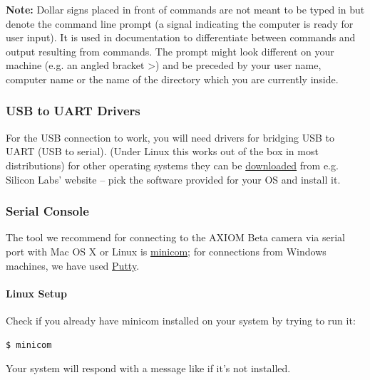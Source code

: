\textbf{Note:} Dollar signs placed in front of commands are not meant to be typed in but denote the command line prompt (a signal indicating the computer is ready for user input). It is used in documentation to differentiate between commands and output resulting from commands. The prompt might look different on your machine (e.g. an angled bracket >) and be preceded by your user name, computer name or the name of the directory which you are currently inside.



\subsubsection{USB to UART Drivers}

For the USB connection to work, you will need drivers for bridging USB to UART (USB to serial). (Under Linux this works out of the box in most 	distributions) for other operating systems they can be \href{https://www.silabs.com/products/development-tools/software/usb-to-uart-bridge-vcp-drivers}{downloaded} from e.g. Silicon Labs' website – pick the software provided for your OS and install it. \\

\subsubsection{Serial Console}

The tool we recommend for connecting to the AXIOM Beta camera via serial port with Mac OS X or Linux is \href{https://linux.die.net/man/1/minicom}{minicom}; for connections from Windows machines, we have used \href{http://www.putty.org/}{Putty}.

\paragraph{Linux Setup}

Check if you already have minicom installed on your system by trying to run it:

\begin{lstlisting}[language=bash,morekeywords=$,keywordstyle=\bfseries,frame=none,xleftmargin=.25in,belowskip=2em, aboveskip=2em]
$ minicom
\end{lstlisting}

Your system will respond with a message like  if it's not installed.\\

